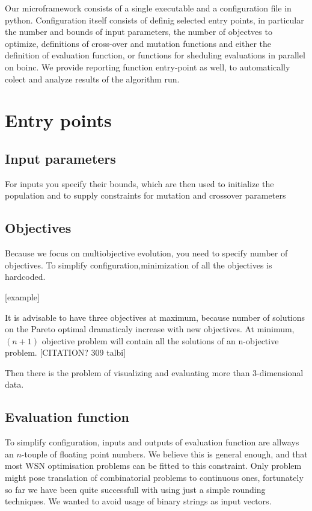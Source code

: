 \documentclass[12pt,oneside,draft]{fithesis2}
\begin{document}
Our microframework consists of a single executable and a configuration file in python. Configuration itself consists of definig selected entry points, in particular the number and bounds of input parameters, the number of objectves to optimize, definitions of cross-over and mutation functions and either the definition of evaluation function, or functions for sheduling evaluations in parallel on boinc. We provide reporting function entry-point as well, to automatically colect and analyze results of the algorithm run.

\section{Entry points}

\subsection{Input parameters}
For inputs you specify their bounds, which are then used to initialize the population and to supply constraints for mutation and crossover parameters

\subsection{Objectives}
Because we focus on multiobjective evolution, you need to specify number of objectives. To simplify configuration,minimization of all the objectives is hardcoded.

[example]

It is advisable to have three objectives at maximum, because number of solutions on the Pareto optimal dramaticaly increase with new objectives.
At minimum, $(n+1)$ objective problem will contain all the solutions of an n-objective problem. [CITATION? 309 talbi]

Then there is the problem of visualizing and evaluating more than 3-dimensional data.

\subsection{Evaluation function}

To simplify configuration, inputs and outputs of evaluation function are allways an $n$-touple of floating point numbers. We believe this is general enough, and that most WSN optimisation problems can be fitted to this constraint. Only problem might pose translation of combinatorial problems to continuous ones, fortunately so far we have been quite successfull with using just a simple rounding techniques. We wanted to avoid usage of binary strings as input vectors.
\end{document}
